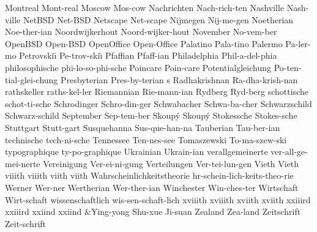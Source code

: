 \NewWordtrue
\1 Montreal		Mont-real		%
\1 Moscow		Mos-cow
\1 Nachrichten          Nach-rich-ten
\1 Nashville		Nash-ville
\1 NetBSD		Net-BSD 		%
\1 Netscape		Net-scape		%
\1 Nijmegen		Nij-me-gen
\1 Noetherian		Noe-ther-ian
\1 Noordwijkerhout	Noord-wijker-hout
\1 November		No-vem-ber
\1 OpenBSD		Open-BSD		%
\1 OpenOffice		Open-Office		%
\1 Palatino		Pala-tino		%
\1 Palermo		Pa-ler-mo
\1 Petrovski\u\i{}	Pe-trov-ski\u\i{}	%
\1 Pfaffian		Pfaff-ian		%
\1 Philadelphia		Phil-a-del-phia
\1 philosophische       phi-lo-so-phi-sche	%
\1 Poincare		Poin-care
\1 Potentialgleichung	Po-ten-tial-glei-chung
\NewWordtrue
\5 Presbyterian		Pres-by-terian s	%
\1 Radhakrishnan	Ra-dha-krish-nan   %
\1 rathskeller		raths-kel-ler
\1 Riemannian		Rie-mann-ian
\1 Rydberg		Ryd-berg
\1 schottische		schot-ti-sche
\1 Schrodinger		Schro-din-ger
\1 Schwabacher		Schwa-ba-cher
\1 Schwarzschild	Schwarz-schild
\1 September		Sep-tem-ber
\1 Skoup\'y		Skoup\'y		%
\1 Stokessche		Stokes-sche
\1 Stuttgart		Stutt-gart
\1 Susquehanna		Sus-que-han-na
\1 Tauberian		Tau-ber-ian          %
\1 technische		tech-ni-sche
\1 Tennessee		Ten-nes-see
\1 Tomaszewski		To-ma-szew-ski		%
\1 typographique	ty-po-graphique      %
\1 Ukrainian		Ukrain-ian
\1 verallgemeinerte	ver-all-ge-mei-nerte
\1 Vereinigung		Ver-ei-ni-gung
\1 Verteilungen 	Ver-tei-lun-gen
\NewWordtrue
\1 Vieth		Vieth			%
\1 viiith		viiith			%
\1 viith		viith			%
\1 Wahrscheinlichkeitstheorie  hr-schein-lich-keits-theo-rie
\1 Werner		Wer-ner		%
\1 Wertherian		Wer-ther-ian
\1 Winchester		Win-ches-ter
\1 Wirtschaft		Wirt-schaft		%
\1 wissenschaftlich	wis-sen-schaft-lich
\1 xviiith		xviiith			%
\1 xviith		xviith			%
\1 xxiiird		xxiiird			%
\1 xxiind		xxiind			%
\tabalign {}&Ying-yong Shu-xue Ji-suan\cr
\1 Zealand		Zea-land
\1 Zeitschrift		Zeit-schrift
\endgraf
\endgroup

\makesignature
\endarticle
